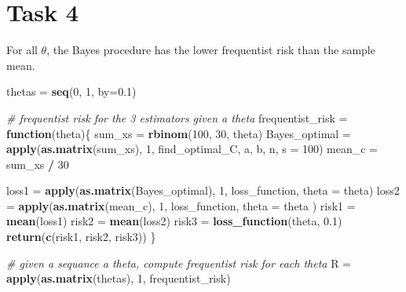 \documentclass[
]{article}
\newenvironment{Shaded}{\begin{snugshade}}{\end{snugshade}}
\newcommand{\CommentTok}[1]{\textcolor[rgb]{0.56,0.35,0.01}{\textit{#1}}}
\newcommand{\ControlFlowTok}[1]{\textcolor[rgb]{0.13,0.29,0.53}{\textbf{#1}}}
\newcommand{\DataTypeTok}[1]{\textcolor[rgb]{0.13,0.29,0.53}{#1}}
\newcommand{\DecValTok}[1]{\textcolor[rgb]{0.00,0.00,0.81}{#1}}
\newcommand{\FloatTok}[1]{\textcolor[rgb]{0.00,0.00,0.81}{#1}}
\newcommand{\KeywordTok}[1]{\textcolor[rgb]{0.13,0.29,0.53}{\textbf{#1}}}
\newcommand{\NormalTok}[1]{#1}
\newcommand{\OperatorTok}[1]{\textcolor[rgb]{0.81,0.36,0.00}{\textbf{#1}}}
\newcommand{\StringTok}[1]{\textcolor[rgb]{0.31,0.60,0.02}{#1}}
\begin{document}
\hypertarget{task-4}{%
\section{Task 4}\label{task-4}}

For all \(\theta\), the Bayes procedure has the lower frequentist risk
than the sample mean.

\begin{Shaded}
\begin{Highlighting}[]
\NormalTok{thetas =}\StringTok{ }\KeywordTok{seq}\NormalTok{(}\DecValTok{0}\NormalTok{, }\DecValTok{1}\NormalTok{, }\DataTypeTok{by=}\FloatTok{0.1}\NormalTok{)}

\CommentTok{# frequentist risk for the 3 estimators given a theta}
\NormalTok{frequentist_risk =}\StringTok{ }\ControlFlowTok{function}\NormalTok{(theta)\{}
\NormalTok{  sum_xs =}\StringTok{ }\KeywordTok{rbinom}\NormalTok{(}\DecValTok{100}\NormalTok{, }\DecValTok{30}\NormalTok{, theta)}
\NormalTok{  Bayes_optimal =}\StringTok{ }\KeywordTok{apply}\NormalTok{(}\KeywordTok{as.matrix}\NormalTok{(sum_xs), }\DecValTok{1}\NormalTok{, find_optimal_C, a, b, n, }\DataTypeTok{s =} \DecValTok{100}\NormalTok{)}
\NormalTok{  mean_c =}\StringTok{ }\NormalTok{sum_xs }\OperatorTok{/}\StringTok{ }\DecValTok{30}
  
\NormalTok{  loss1 =}\StringTok{ }\KeywordTok{apply}\NormalTok{(}\KeywordTok{as.matrix}\NormalTok{(Bayes_optimal), }\DecValTok{1}\NormalTok{, loss_function, }\DataTypeTok{theta =}\NormalTok{ theta)}
\NormalTok{  loss2 =}\StringTok{ }\KeywordTok{apply}\NormalTok{(}\KeywordTok{as.matrix}\NormalTok{(mean_c), }\DecValTok{1}\NormalTok{, loss_function, }\DataTypeTok{theta =}\NormalTok{ theta )}
\NormalTok{  risk1 =}\StringTok{ }\KeywordTok{mean}\NormalTok{(loss1)}
\NormalTok{  risk2 =}\StringTok{ }\KeywordTok{mean}\NormalTok{(loss2)}
\NormalTok{  risk3 =}\StringTok{ }\KeywordTok{loss_function}\NormalTok{(theta, }\FloatTok{0.1}\NormalTok{)}
  \KeywordTok{return}\NormalTok{(}\KeywordTok{c}\NormalTok{(risk1, risk2, risk3))}
\NormalTok{\}}

\CommentTok{# given a sequance a theta, compute frequentist risk for each theta}
\NormalTok{R =}\StringTok{ }\KeywordTok{apply}\NormalTok{(}\KeywordTok{as.matrix}\NormalTok{(thetas), }\DecValTok{1}\NormalTok{, frequentist_risk)}


\end{Highlighting}
\end{Shaded}
\end{document}
